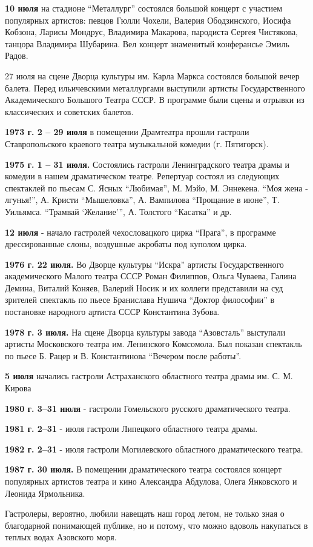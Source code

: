 \textbf{10 июля} на стадионе \enquote{Металлург} состоялся большой концерт с участием популярных
артистов: певцов Гюлли Чохели, Валерия Ободзинского, Иосифа Кобзона, Ларисы
Мондрус, Владимира Макарова, пародиста Сергея Чистякова, танцора Владимира
Шубарина. Вел концерт знаменитый конферансье Эмиль Радов.

27 июля на сцене Дворца культуры им. Карла Маркса состоялся большой вечер
балета. Перед ильичевскими металлургами выступили артисты Государственного
Академического Большого Театра СССР. В программе были сцены и отрывки из
классических и советских балетов.

\textbf{1973 г. 2 – 29 июля} в помещении Драмтеатра прошли гастроли Ставропольского
краевого театра музыкальной комедии (г. Пятигорск).

\textbf{1975 г. 1 – 31 июля.} Состоялись гастроли Ленинградского театра драмы и комедии
в нашем драматическом театре. Репертуар состоял из следующих спектаклей по
пьесам С. Ясных \enquote{Любимая}, М. Мэйо, М. Эннекена. \enquote{Моя жена - лгунья!}, А.
Кристи \enquote{Мышеловка}, А. Вампилова \enquote{Прощание в июне}, Т. Уильямса. \enquote{Трамвай
\enquote{Желание}}, А. Толстого \enquote{Касатка} и др.

\textbf{12 июля} - начало гастролей чехословацкого цирка \enquote{Прага}, в программе
дрессированные слоны, воздушные акробаты под куполом цирка.

\textbf{1976 г. 22 июля.} Во Дворце культуры \enquote{Искра} артисты Государственного
академического Малого театра СССР Роман Филиппов, Ольга Чуваева, Галина Демина,
Виталий Коняев, Валерий Носик и их коллеги представили на суд зрителей
спектакль по пьесе Бранислава Нушича \enquote{Доктор философии} в постановке народного
артиста СССР Константина Зубова.

\textbf{1978 г. 3 июля.} На сцене Дворца культуры завода \enquote{Азовсталь} выступали артисты
Московского театра им. Ленинского Комсомола. Был показан спектакль по пьесе Б.
Рацер и В. Константинова \enquote{Вечером после работы}.

\textbf{5 июля} начались гастроли Астраханского областного театра драмы им. С. М. Кирова

\textbf{1980 г. 3–31 июля} - гастроли Гомельского русского драматического театра.

\textbf{1981 г. 2–31} - июля гастроли Липецкого областного театра драмы.

\textbf{1982 г. 2–31} - июля гастроли Могилевского областного драматического театра.

\textbf{1987 г. 30 июля.} В помещении драматического театра состоялся концерт
популярных артистов театра и кино Александра Абдулова, Олега Янковского и
Леонида Ярмольника.

Гастролеры, вероятно, любили навещать наш город летом, не только зная о
благодарной понимающей публике, но и потому, что можно вдоволь накупаться в
теплых водах Азовского моря.

